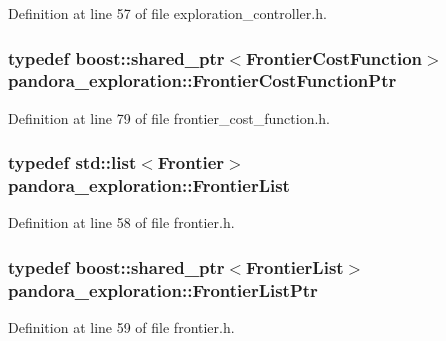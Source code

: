 \-Definition at line 57 of file exploration\-\_\-controller.\-h.

\hypertarget{namespacepandora__exploration_ae01d77b922afd1af6a1db394d19d9cde}{
\subsubsection[{\-Frontier\-Cost\-Function\-Ptr}]{\setlength{\rightskip}{0pt plus 5cm}typedef boost\-::shared\-\_\-ptr$<${\bf \-Frontier\-Cost\-Function}$>$ {\bf pandora\-\_\-exploration\-::\-Frontier\-Cost\-Function\-Ptr}}}\label{namespacepandora__exploration_ae01d77b922afd1af6a1db394d19d9cde}


\-Definition at line 79 of file frontier\-\_\-cost\-\_\-function.\-h.

\hypertarget{namespacepandora__exploration_ac53a7b62c5b3973ce061b6e233945cda}{
\subsubsection[{\-Frontier\-List}]{\setlength{\rightskip}{0pt plus 5cm}typedef std\-::list$<${\bf \-Frontier}$>$ {\bf pandora\-\_\-exploration\-::\-Frontier\-List}}}\label{namespacepandora__exploration_ac53a7b62c5b3973ce061b6e233945cda}


\-Definition at line 58 of file frontier.\-h.

\hypertarget{namespacepandora__exploration_a6f3b1959fca391e2ef3ac46b6e96be7a}{
\subsubsection[{\-Frontier\-List\-Ptr}]{\setlength{\rightskip}{0pt plus 5cm}typedef boost\-::shared\-\_\-ptr$<${\bf \-Frontier\-List}$>$ {\bf pandora\-\_\-exploration\-::\-Frontier\-List\-Ptr}}}\label{namespacepandora__exploration_a6f3b1959fca391e2ef3ac46b6e96be7a}


\-Definition at line 59 of file frontier.\-h.

